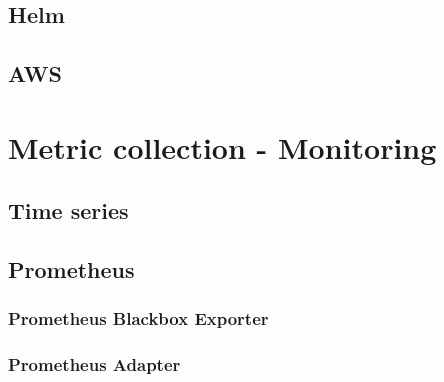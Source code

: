 \subsection{Helm}

\subsection{AWS}


\section{Metric collection - Monitoring}

\subsection{Time series}

\subsection{Prometheus}

\subsubsection{Prometheus Blackbox Exporter}

\subsubsection{Prometheus Adapter}


